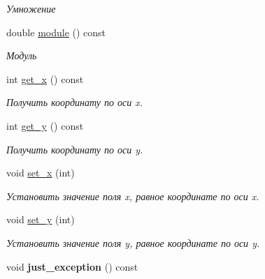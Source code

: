 \begin{DoxyCompactItemize}
\begin{DoxyCompactList}\small\item\em Умножение \end{DoxyCompactList}\item 
double \hyperlink{classmy__vector_ad5944ee980eb7c793a219ca97f13cc51}{module} () const 
\begin{DoxyCompactList}\small\item\em Модуль \end{DoxyCompactList}\item 
int \hyperlink{classmy__vector_a407ee02aaf91a4337e1d24ee61305703}{get\+\_\+x} () const 
\begin{DoxyCompactList}\small\item\em Получить координату по оси x. \end{DoxyCompactList}\item 
int \hyperlink{classmy__vector_abb7cd5006d520163f1b3ca9ec59c9b75}{get\+\_\+y} () const 
\begin{DoxyCompactList}\small\item\em Получить координату по оси y. \end{DoxyCompactList}\item 
\hypertarget{classmy__vector_a1ed099bda3e8f21bb85389137b6d3395}{void \hyperlink{classmy__vector_a1ed099bda3e8f21bb85389137b6d3395}{set\+\_\+x} (int)}\label{classmy__vector_a1ed099bda3e8f21bb85389137b6d3395}

\begin{DoxyCompactList}\small\item\em Установить значение поля x, равное координате по оси x. \end{DoxyCompactList}\item 
\hypertarget{classmy__vector_adb1aa58aec414c104fc3114403167497}{void \hyperlink{classmy__vector_adb1aa58aec414c104fc3114403167497}{set\+\_\+y} (int)}\label{classmy__vector_adb1aa58aec414c104fc3114403167497}

\begin{DoxyCompactList}\small\item\em Установить значение поля y, равное координате по оси y. \end{DoxyCompactList}\item 
\hypertarget{classmy__vector_aca2bb145ee946c3d1d5c8776385e13a6}{void {\bfseries just\+\_\+exception} () const }\label{classmy__vector_aca2bb145ee946c3d1d5c8776385e13a6}

\end{DoxyCompactItemize}



